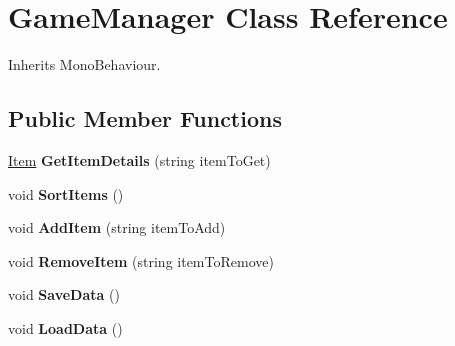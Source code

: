 \hypertarget{class_game_manager}{}\section{Game\+Manager Class Reference}
\label{class_game_manager}


Inherits Mono\+Behaviour.

\subsection*{Public Member Functions}
\begin{DoxyCompactItemize}
\item 
\mbox{\label{class_game_manager_a88d080cf2f9ddcdcf37d05517b38b37c}} 
\mbox{\hyperlink{class_item}{Item}} {\bfseries Get\+Item\+Details} (string item\+To\+Get)
\item 
\mbox{\label{class_game_manager_af6accaf6fdc6705545e843363cafaa7b}} 
void {\bfseries Sort\+Items} ()
\item 
\mbox{\label{class_game_manager_a019f8088ac929d998f65e2be1f63060a}} 
void {\bfseries Add\+Item} (string item\+To\+Add)
\item 
\mbox{\label{class_game_manager_a59ac13fb2fba9f4fae93ef5f46eeecf9}} 
void {\bfseries Remove\+Item} (string item\+To\+Remove)
\item 
\mbox{\label{class_game_manager_ace5f1f713870e111e51171dedb746e94}} 
void {\bfseries Save\+Data} ()
\item 
\mbox{\label{class_game_manager_aafd31c8dff1a85c6ebcb0d66ec4ba8ae}} 
void {\bfseries Load\+Data} ()
\end{DoxyCompactItemize}
